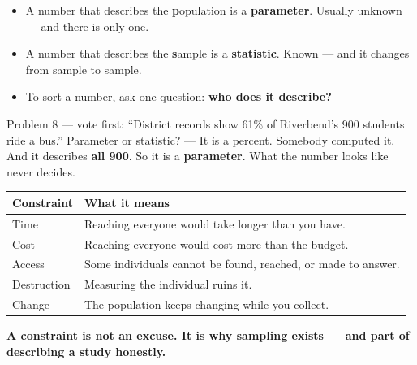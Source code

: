 \documentclass[aspectratio=169, 11pt]{beamer}
\newcommand{\redink}[1]{{\color{redacc}\bfseries #1}}
\begin{document}
\begin{frame}[t, plain]
  \vspace{4pt}
  \begin{itemize}\setlength{\itemsep}{6pt}
    \item A number that describes the \textbf{p}opulation is a \textbf{\color{cerulean}parameter}.
          Usually unknown --- and there is only one.
    \item A number that describes the \textbf{s}ample is a \textbf{\color{cerulean}statistic}.
          Known --- and it changes from sample to sample.
    \item To sort a number, ask one question: \redink{who does it describe?}
  \end{itemize}
  \vspace{8pt}
  \begin{block}{Problem 8 --- vote first: ``District records show 61\% of Riverbend's 900 students ride a bus.''}
    Parameter or statistic? --- It is a percent. Somebody computed it. And it describes
    \textbf{all 900}. So it is a \redink{parameter}. What the number looks like never decides.
  \end{block}
\end{frame}

\begin{frame}[t, plain]
  \vspace{2pt}
  \begin{center}
    \small
    \renewcommand{\arraystretch}{1.3}
    \begin{tabular}{@{} l l @{}}
    \hline
    \textbf{Constraint} & \textbf{What it means} \\
    \hline
    Time        & Reaching everyone would take longer than you have. \\
    Cost        & Reaching everyone would cost more than the budget. \\
    Access      & Some individuals cannot be found, reached, or made to answer. \\
    Destruction & Measuring the individual ruins it. \\
    Change      & The population keeps changing while you collect. \\
    \hline
    \end{tabular}
  \end{center}
  \vspace{8pt}
  \begin{center}
    {\color{cerulean}\bfseries A constraint is not an excuse. It is why sampling exists ---
    and part of describing a study honestly.}
  \end{center}
\end{frame}
\end{document}
